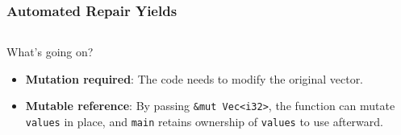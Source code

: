 \subsubsection*{Automated Repair Yields}
\inputminted{rust}{6_appendices/app1_code/ex3_ar.rs}
\noindent What's going on?
\begin{itemize}
    \item \textbf{Mutation required}: The code needs to modify the original
    vector.
    \item \textbf{Mutable reference}: By passing \texttt{\&mut Vec<i32>}, the
    function can mutate \texttt{values} in place, and \texttt{main} retains
    ownership of \texttt{values} to use afterward.
\end{itemize}
